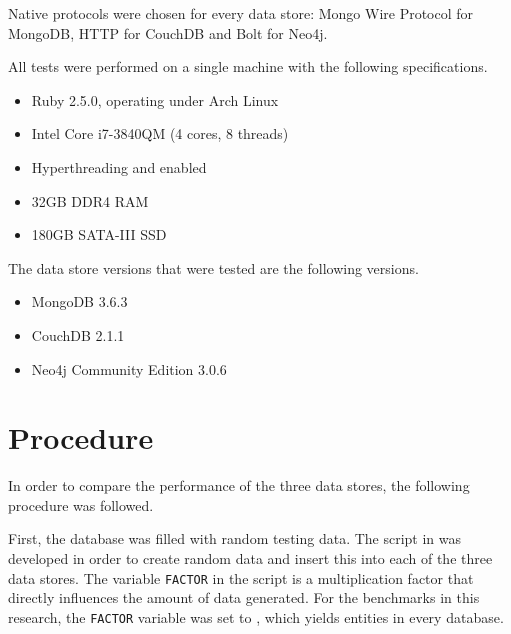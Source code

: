Native protocols were chosen for every data store: Mongo Wire Protocol for MongoDB, HTTP for CouchDB and Bolt for Neo4j.

All tests were performed on a single machine with the following specifications.

\begin{itemize}
  \item Ruby 2.5.0, operating under Arch Linux
  \item Intel Core i7-3840QM (4 cores, 8 threads)
  \item Hyperthreading and  enabled
  \item 32GB DDR4 RAM
  \item 180GB SATA-III SSD
\end{itemize}

The data store versions that were tested are the following versions.

\begin{itemize}
  \item MongoDB 3.6.3
  \item CouchDB 2.1.1
  \item Neo4j Community Edition 3.0.6
\end{itemize}

\section{Procedure}
\label{sec:procedure}

In order to compare the performance of the three data stores, the following procedure was followed.

First, the database was filled with random testing data.
The script in  was developed in order to create random data and insert this into each of the three data stores.
The variable \texttt{FACTOR} in the script is a multiplication factor that directly influences the amount of data generated.
For the benchmarks in this research, the \texttt{FACTOR} variable was set to , which yields  entities in every database.


